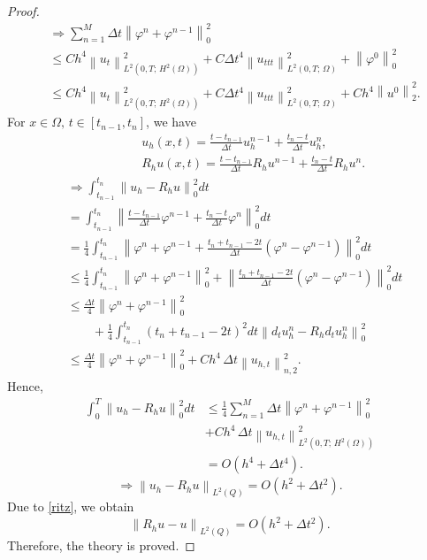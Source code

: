 \documentclass[notitlepage,a4paper,fleqn,9pt]{icmfarticle}
\begin{document}
\begin{multicols}{2}
\begin{proof}
\begin{align*}
		&\Rightarrow\sum_{n=1}^{M}\Delta t\left\|\varphi^n+\varphi^{n-1}\right\|^2_0\\
		&\leq C h^4\left\|u_t\right\|_{L^2\left(0, T;\, H^2(\Omega)\right)}^2+C \Delta t^4\left\|u_{ttt}\right\|_{L^2(0, T;\, \Omega)}^2+\left\|\varphi^{0}\right\|^2_0\\
		&\leq C h^4\left\|u_t\right\|_{L^2\left(0, T;\, H^2(\Omega)\right)}^2+C \Delta t^4\left\|u_{ttt}\right\|_{L^2(0, T;\, \Omega)}^2+Ch^4\left\|u^{0}\right\|^2_2.
	\end{align*}
	For $x\in \Omega,\, t\in [t_{n-1}, t_n]$, we have
	\begin{align*}
		\qquad\quad&u_h(x, t)=\frac{t-t_{n-1}}{\Delta t}u_h^{n-1}+\frac{t_n-t}{\Delta t}u_h^{n},\\
		&R_hu(x, t)=\frac{t-t_{n-1}}{\Delta t}R_hu^{n-1}+\frac{t_n-t}{\Delta t}R_hu^{n}.
	\end{align*}
	\begin{align*}
		&\Rightarrow \int_{t_{n-1}}^{t_n}\left\|u_h-R_hu\right\|_0^2dt\\
		&= \int_{t_{n-1}}^{t_n}\left\|\frac{t-t_{n-1}}{\Delta t}\varphi^{n-1}+\frac{t_n-t}{\Delta t}\varphi^n\right\|_0^2dt\\%
		&=\frac{1}{4}\int_{t_{n-1}}^{t_n}\left\|\varphi^n+\varphi^{n-1}+\frac{t_n+t_{n-1}-2t}{\Delta t}\left(\varphi^n-\varphi^{n-1}\right)\right\|_0^2dt\\
		&\leq\frac{1}{4}\int_{t_{n-1}}^{t_n}\left\|\varphi^n+\varphi^{n-1}\right\|_0^2+\left\|\frac{t_n+t_{n-1}-2t}{\Delta t}\left(\varphi^n-\varphi^{n-1}\right)\right\|_0^2dt\\
		&\leq\frac{\Delta t}{4}\left\|\varphi^n+\varphi^{n-1}\right\|_0^2\\
		&\qquad+\frac{1}{4}\int_{t_{n-1}}^{t_n}\left(t_n+t_{n-1}-2t\right)^2dt\left\|d_tu_h^n-R_hd_tu_h^n\right\|^2_0\\
		&\leq\frac{\Delta t}{4}\left\|\varphi^n+\varphi^{n-1}\right\|_0^2+Ch^4\,\Delta t\left\|u_{h, t}\right\|_{n, 2}^2.
	\end{align*}
	Hence,
	\begin{align*}
		\int_0^T\left\|u_h-R_hu\right\|_0^2dt&\leq \frac{1}{4}\sum_{n=1}^{M}\Delta t\left\|\varphi^n+\varphi^{n-1}\right\|^2_0\\
		&+Ch^4\,\Delta t\left\|u_{h, t}\right\|_{L^2\left(0, T;\, H^2(\Omega)\right)}^2\\
		&=O(h^4+\Delta t^4).
	\end{align*}
	$$\Rightarrow \left\|u_h-R_hu\right\|_{L^2(Q)}=O(h^2+\Delta t^2).$$
	Due to \eqref{ritz}, we obtain
	$$\left\|R_hu-u\right\|_{L^2(Q)}=O(h^2+\Delta t^2).$$
	Therefore, the theory is proved.
\end{proof}


\end{multicols}
\end{document}
